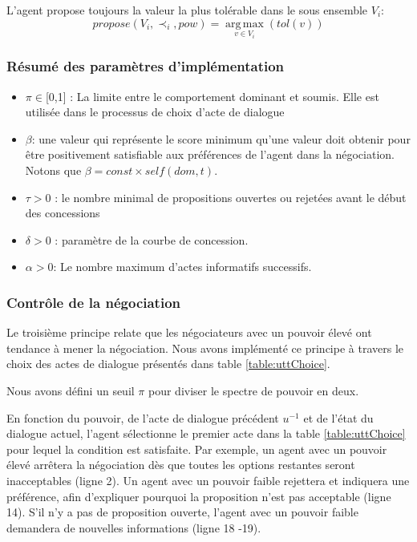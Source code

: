 \documentclass [french]{sig-alternate-05-2015}
\begin{document}
		\noindent
		L'agent propose toujours la valeur la plus tolérable dans le sous ensemble $V_i$:
		\begin{equation}
		propose(V_i, \prec_i,pow) =  \operatorname*{arg\,max}_{v \in V_i} ( tol(v))
		\end{equation}
		
		
			\subsubsection*{Résumé des paramètres d'implémentation }
			\begin{itemize}[noitemsep]
				
				\item $\pi \in $[0,1] : La limite entre le comportement dominant et soumis. Elle est utilisée dans le processus de choix d'acte de dialogue
				\item $\beta$:  une valeur qui représente le score minimum qu'une valeur doit obtenir pour être positivement satisfiable aux préférences de l'agent dans la négociation. Notons que $\beta = const \times self(dom,t)$.
				\item $\tau > 0$ : le nombre minimal de propositions ouvertes ou rejetées avant le début des concessions
				\item $\delta > 0$ : paramètre de la courbe de concession.
				\item $\alpha> 0$: Le nombre maximum d'actes informatifs successifs.
			\end{itemize}
		
		\subsubsection {Contrôle de la négociation}
		Le troisième principe relate que les négociateurs avec un pouvoir élevé ont tendance à mener la négociation. Nous avons implémenté ce principe à travers le choix des actes de dialogue présentés dans table \ref {table:uttChoice}.
		
		Nous avons défini un seuil $ \pi $ pour diviser le spectre de pouvoir en deux.
		
		En fonction du pouvoir, de l'acte de dialogue précédent $ u ^ {- 1} $ et de l'état du dialogue actuel, l'agent sélectionne le premier acte dans la table \ref {table:uttChoice} pour lequel la condition est satisfaite. 
		Par exemple, un agent avec un pouvoir élevé arrêtera la négociation dès que toutes les options restantes seront inacceptables (ligne 2). Un agent avec un pouvoir faible rejettera et indiquera une préférence, afin d'expliquer pourquoi la proposition n'est pas acceptable (ligne 14). S'il n'y a pas de proposition ouverte, l'agent avec un pouvoir faible demandera de nouvelles informations (ligne 18 -19).
		
\end{document}
